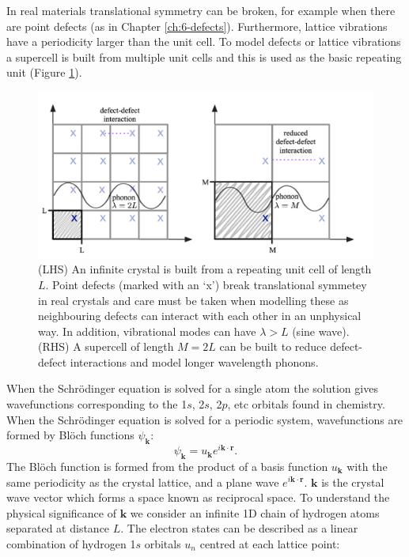 In real materials translational symmetry can be broken, for example when there are point defects (as in Chapter \ref{ch:6-defects}). Furthermore, lattice vibrations have a periodicity larger than the unit cell. To model defects or lattice vibrations a supercell is built from multiple unit cells and this is used as the basic repeating unit (Figure \ref{translational}).

\begin{figure}[h]
\centering
  \includegraphics[width=0.8\columnwidth]{figures/ch3/supercell.png}
  \caption[Translational symmetry and supercell construction]{(LHS) An infinite crystal is built from a repeating unit cell of length $L$. Point defects (marked with an `x') break translational symmetey in real crystals and care must be taken when modelling these as neighbouring defects can interact with each other in an unphysical way. In addition, vibrational modes can have $\lambda>L$ (sine wave). (RHS) A supercell of length $M=2L$ can be built to reduce defect-defect interactions and model longer wavelength phonons. } 
  \label{translational}
\end{figure}

When the Schr\"{o}dinger equation is solved for a single atom the solution gives wavefunctions corresponding to the 1$s$, 2$s$, 2$p$, etc orbitals found in chemistry. When the Schr\"{o}dinger equation is solved for a periodic system, wavefunctions are formed by Bl\"{o}ch functions $\psi_{\textbf{k}}$:\autocite{Hoffmann1987}
\begin{equation} \label{bloch}
\psi_{\textbf{k}} = u_\textbf{k}e^{i\textbf{k}\cdot\textbf{r}}.
\end{equation}   %
The Bl\"{o}ch function is formed from the product of a basis function $u_\textbf{k}$ with the same periodicity as the crystal lattice, and a plane wave $e^{i\textbf{k}\cdot\textbf{r}}$. $\textbf{k}$ is the crystal wave vector which forms a space known as reciprocal space. To understand the physical significance of $\textbf{k}$ we consider an infinite 1D chain of hydrogen atoms separated at distance $L$. The electron states can be described as a linear combination of hydrogen 1$s$ orbitals $u_n$ centred at each lattice point:

